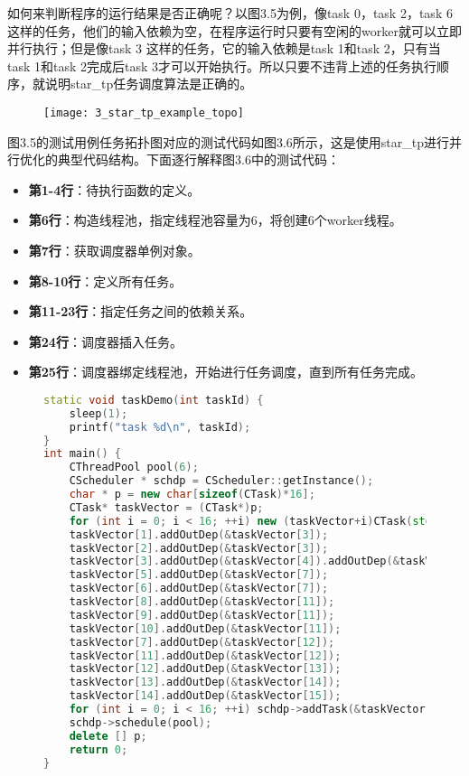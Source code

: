 如何来判断程序的运行结果是否正确呢？以图3.5为例，像task 0，task 2，task 6这样的任务，他们的输入依赖为空，在程序运行时只要有空闲的worker就可以立即并行执行；但是像task 3 这样的任务，它的输入依赖是task 1和task 2，只有当task 1和task 2完成后task 3才可以开始执行。所以只要不违背上述的任务执行顺序，就说明star\_tp任务调度算法是正确的。

\begin{figure}[!htbp]
    \centering
    \texttt{[image: 3\_star\_tp\_example\_topo]}
    \label{fig:3_star_tp_example_topo}
\end{figure}

图3.5的测试用例任务拓扑图对应的测试代码如图3.6所示，这是使用star\_tp进行并行优化的典型代码结构。下面逐行解释图3.6中的测试代码：

\begin{itemize}
	\item \textbf{第1-4行}：待执行函数的定义。
	\item \textbf{第6行}：构造线程池，指定线程池容量为6，将创建6个worker线程。
	\item \textbf{第7行}：获取调度器单例对象。
	\item \textbf{第8-10行}：定义所有任务。
	\item \textbf{第11-23行}：指定任务之间的依赖关系。
	\item \textbf{第24行}：调度器插入任务。
	\item \textbf{第25行}：调度器绑定线程池，开始进行任务调度，直到所有任务完成。
\end{itemize}

\begin{figure}[!htbp]
    \centering
\begin{lstlisting}[language=c++,caption={}]
static void taskDemo(int taskId) {
    sleep(1);
    printf("task %d\n", taskId);
}
int main() {
    CThreadPool pool(6);
    CScheduler * schdp = CScheduler::getInstance();
    char * p = new char[sizeof(CTask)*16];
    CTask* taskVector = (CTask*)p;
    for (int i = 0; i < 16; ++i) new (taskVector+i)CTask(std::function<void()>(std::bind(taskDemo, i)));
    taskVector[1].addOutDep(&taskVector[3]);
    taskVector[2].addOutDep(&taskVector[3]);
    taskVector[3].addOutDep(&taskVector[4]).addOutDep(&taskVector[7]);
    taskVector[5].addOutDep(&taskVector[7]);
    taskVector[6].addOutDep(&taskVector[7]);
    taskVector[8].addOutDep(&taskVector[11]);
    taskVector[9].addOutDep(&taskVector[11]);
    taskVector[10].addOutDep(&taskVector[11]);
    taskVector[7].addOutDep(&taskVector[12]);
    taskVector[11].addOutDep(&taskVector[12]);
    taskVector[12].addOutDep(&taskVector[13]);
    taskVector[13].addOutDep(&taskVector[14]);
    taskVector[14].addOutDep(&taskVector[15]);
    for (int i = 0; i < 16; ++i) schdp->addTask(&taskVector[i]);
    schdp->schedule(pool);
    delete [] p;
    return 0;
}
\end{lstlisting}
    \label{fig:3_star_tp_example_code}
\end{figure}

